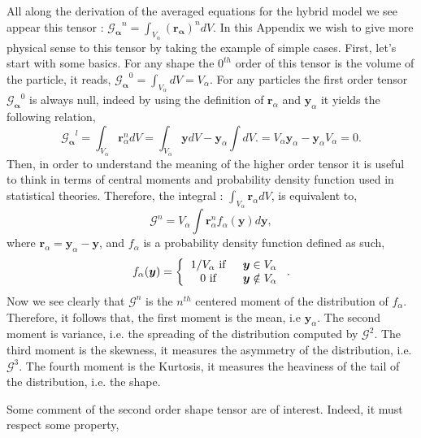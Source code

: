 {All along the derivation of the averaged equations for the hybrid model we see appear this tensor : $\bm{\mathcal{G}_\alpha}^n = \int_{V_\alpha} \left(\bm{\bm{r}_\alpha}\right)^n dV$. 
In this Appendix we wish to give more physical sense to this tensor by taking the example of simple cases.
First, let's start with some basics.
For any shape the $0^{th}$ order of this tensor is the volume of the particle, it reads, $\bm{\mathcal{G}_\alpha}^0 = \int_{V_\alpha} dV = V_\alpha$.
For any particles the first order tensor $\bm{\mathcal{G}_\alpha}^0$ is always null, indeed by using the definition of  $\bm{r}_\alpha$ and $\bm{y}_\alpha$  it yields the following relation,
\begin{equation}
    \bm{\mathcal{G}_\alpha}^l
    = \int_{V_\alpha} \bm{r}_\alpha^n dV 
    = \int_{V_\alpha} \bm{y} dV - \bm{y}_\alpha \int  dV .
    = V_\alpha \bm{y}_\alpha - \bm{y}_\alpha V_\alpha 
    = 0.
\end{equation}
Then, in order to understand the meaning of the higher order tensor it is useful to think in terms of central moments and probability density function used in statistical theories. 
Therefore, the integral : $\int_{V_\alpha} \bm{r}_\alpha dV$, is equivalent to, 
\begin{equation}
    \mathcal{G}^n 
    = V_\alpha\int \bm{r}_\alpha^n f_\alpha(\bm{y}) d\bm{y},
\end{equation}
where $\bm{r}_\alpha = \bm{y}_\alpha -\bm{y}$, and $f_\alpha$ is a probability density function defined as such,
\begin{equation}
    f_\alpha(\bm{y}) = \left\{
        \begin{tabular}{cc}
        $1/V_\alpha \text{  if  }$ &$\bm{y}  \in V_\alpha$\\
        $0 \text{  if  }$ &$\bm{y} \notin  V_\alpha$
    \end{tabular}
    \right..
\end{equation}
Now we see clearly that $\mathcal{G}^n$ is the $n^{th}$ centered moment of the distribution of $f_\alpha$. 
Therefore, it follows that,
the first moment is the mean, i.e $\bm{y}_\alpha$. 
The second moment is variance, i.e. the spreading of the distribution computed by $\mathcal{G}^2$. 
The third moment is the skewness, it measures the asymmetry of the distribution, i.e. $\mathcal{G}^3$. 
The fourth moment is the Kurtosis, it measures the heaviness of the tail of the distribution, i.e. the shape. 

Some comment of the second order shape tensor are of interest. 
Indeed, it must respect some property, 

}
